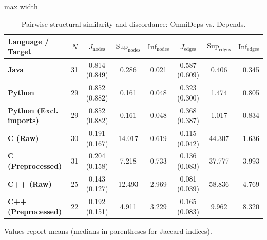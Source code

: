 \begin{table}[htpb]
  \centering
  \small
  \caption{Pairwise structural similarity and discordance: OmniDeps
  vs. Depends.}
  \label{tab:results_depends}
  \label{tab:pairwise_jaccard_summary}
  \label{tab:results_summary_rq2}
  \label{tab:preprocessing_c_cpp_comparison}
  \vspace{0.4em}
  \begin{adjustbox}{max width=\textwidth}
    \begin{tabular}{lccccccr}
      \toprule
      \textbf{Language / Target} & $N$ & $J_{\text{nodes}}$ &
      $\text{Sup}_{\text{nodes}}$ & $\text{Inf}_{\text{nodes}}$ &
      $J_{\text{edges}}$ & $\text{Sup}_{\text{edges}}$ &
      $\text{Inf}_{\text{edges}}$ \\
      \midrule
      \textbf{Java}                   & 31 & 0.814 (0.849) & 0.286  &
      0.021 & 0.587 (0.609) & 0.406  & 0.345 \\
      \textbf{Python}                 & 29 & 0.852 (0.882) & 0.161  &
      0.048 & 0.323 (0.300) & 1.474  & 0.805 \\
      \textbf{Python (Excl. imports)} & 29 & 0.852 (0.882) & 0.161  &
      0.048 & 0.368 (0.387) & 1.017  & 0.834 \\
      \textbf{C (Raw)}                & 30 & 0.191 (0.167) & 14.017 &
      0.619 & 0.115 (0.042) & 44.307 & 1.636 \\
      \textbf{C (Preprocessed)}   & 31 & 0.204 (0.158) & 7.218  &
      0.733 & 0.136 (0.083) & 37.777 & 3.993 \\
      \textbf{C++ (Raw)}          & 25 & 0.143 (0.127) & 12.493 &
      2.969 & 0.081 (0.039) & 58.836 & 4.769 \\
      \textbf{C++ (Preprocessed)} & 22 & 0.192 (0.151) & 4.911  &
      3.229 & 0.165 (0.083) & 9.962  & 8.320 \\
      \bottomrule
    \end{tabular}
  \end{adjustbox}
  \vspace{0.2em}
  \footnotesize
  Values report means (medians in parentheses for Jaccard indices).
\end{table}

